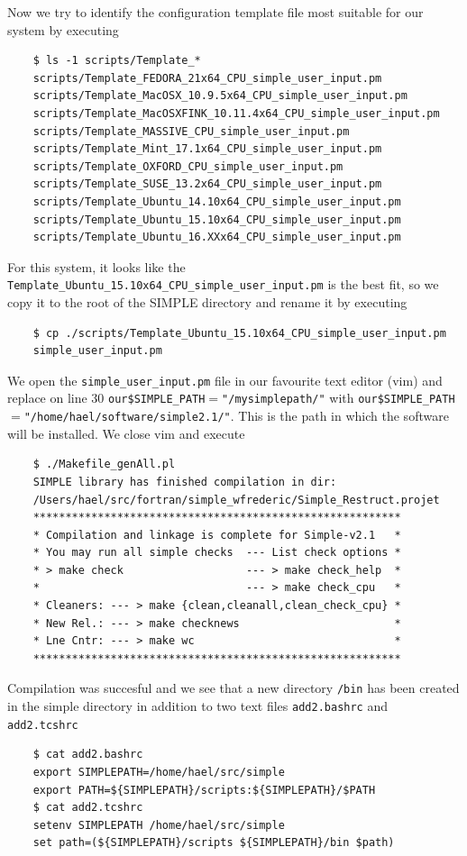 \documentclass[a4paper,11pt]{article}
\begin{document}
Now we try to identify the configuration template file most suitable for our system by executing
\begin{verbatim}
    $ ls -1 scripts/Template_*
    scripts/Template_FEDORA_21x64_CPU_simple_user_input.pm
    scripts/Template_MacOSX_10.9.5x64_CPU_simple_user_input.pm
    scripts/Template_MacOSXFINK_10.11.4x64_CPU_simple_user_input.pm
    scripts/Template_MASSIVE_CPU_simple_user_input.pm
    scripts/Template_Mint_17.1x64_CPU_simple_user_input.pm
    scripts/Template_OXFORD_CPU_simple_user_input.pm
    scripts/Template_SUSE_13.2x64_CPU_simple_user_input.pm
    scripts/Template_Ubuntu_14.10x64_CPU_simple_user_input.pm
    scripts/Template_Ubuntu_15.10x64_CPU_simple_user_input.pm
    scripts/Template_Ubuntu_16.XXx64_CPU_simple_user_input.pm
\end{verbatim}

For this system, it looks like the \texttt{Template\_Ubuntu\_15.10x64\_CPU\_simple\_user\_input.pm} is the best fit, so we copy it to the root of the SIMPLE directory and rename it by executing
\begin{verbatim}
    $ cp ./scripts/Template_Ubuntu_15.10x64_CPU_simple_user_input.pm
    simple_user_input.pm
\end{verbatim}

We open the \texttt{simple\_user\_input.pm} file in our favourite text editor (vim) and replace on line 30 \texttt{our\$SIMPLE\_PATH$=$"/mysimplepath/"} with \texttt{our\$SIMPLE\_PATH$=$"/home/hael/software/simple2.1/"}. This is the path in which the software will be installed. We close vim and execute
\begin{verbatim}
    $ ./Makefile_genAll.pl
    SIMPLE library has finished compilation in dir:
    /Users/hael/src/fortran/simple_wfrederic/Simple_Restruct.projet
    *********************************************************
    * Compilation and linkage is complete for Simple-v2.1   *
    * You may run all simple checks  --- List check options *
    * > make check                   --- > make check_help  *
    *                                --- > make check_cpu   *
    * Cleaners: --- > make {clean,cleanall,clean_check_cpu} *
    * New Rel.: --- > make checknews                        *
    * Lne Cntr: --- > make wc                               *
    *********************************************************
\end{verbatim}

Compilation was succesful and we see that a new directory \texttt{/bin} has been created in the simple directory in addition to two text files \texttt{add2.bashrc} and \texttt{add2.tcshrc}
\begin{verbatim}
    $ cat add2.bashrc
    export SIMPLEPATH=/home/hael/src/simple
    export PATH=${SIMPLEPATH}/scripts:${SIMPLEPATH}/$PATH
    $ cat add2.tcshrc
    setenv SIMPLEPATH /home/hael/src/simple
    set path=(${SIMPLEPATH}/scripts ${SIMPLEPATH}/bin $path)
\end{verbatim}
\end{document}
